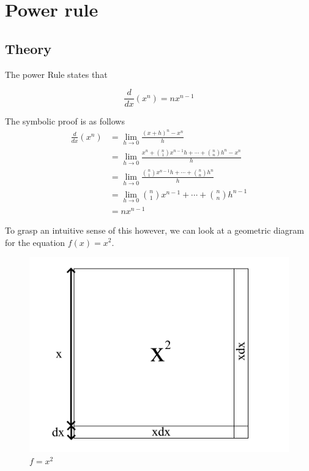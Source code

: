 \documentclass[a4paper,12pt,oneside]{book}
\begin{document}
\section{Power rule}

\subsection{Theory}

The power Rule states that

$$\frac{d}{dx}(x^n)=nx^{n-1}$$

 \noindent The symbolic proof is as follows
$$
\begin{aligned}
\frac{d}{dx}(x^n)&=\lim_{h\to 0}\frac{(x+h)^n-x^n}{h}\\
&=\lim_{h\to 0}\frac{x^n+\binom{n}{1}x^{n-1}h+\cdots +\binom{n}{n}h^n-x^n}{h}\\
&=\lim_{h\to 0}\frac{\binom{n}{1}x^{n-1}h+\cdots +\binom{n}{n}h^n}{h}\\
&=\lim_{h\to 0}\binom{n}{1}x^{n-1}+\cdots +\binom{n}{n}h^{n-1}\\
&=nx^{n-1}
\end{aligned}
$$

 \noindent To grasp an intuitive sense of this however, we can look at a geometric diagram for the equation $f(x)=x^2$.

\begin{figure}[H]
    \begin{center}
        \includegraphics[scale=0.35]{img/zayan/pr1.png}
        \caption{$f=x^2$}
        \label{fig:pr1}
    \end{center}
\end{figure}
\end{document}
